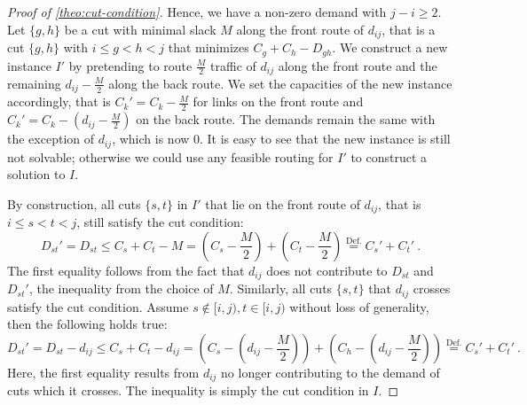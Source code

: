 \begin{proof}[Proof of \cref{theo:cut-condition}]
	Hence, we have a non-zero demand with $j - i \geq 2$. 
	Let $\{g, h\}$ be a cut with minimal slack $M$ along the front route of $d_{ij}$, that is a cut $\{g, h\}$ with $i \leq g < h < j$ that minimizes $C_g + C_h - D_{gh}$.
	We construct a new instance $I'$ by pretending to route $\frac{M}{2}$ traffic of $d_{ij}$ along the front route and the remaining $d_{ij} - \frac{M}{2}$ along the back route.
	We set the capacities of the new instance accordingly, that is $C_k' = C_k - \frac{M}{2}$ for links on the front route and $C_k' = C_k - (d_{ij} - \frac{M}{2})$ on the back route.
	The demands remain the same with the exception of $d_{ij}$, which is now $0$.
	It is easy to see that the new instance is still not solvable; otherwise we could use any feasible routing for $I'$ to construct a solution to $I$.
	
	By construction, all cuts $\{s, t\}$ in $I'$ that lie on the front route of $d_{ij}$, that is $i \leq s < t < j$, still satisfy the cut condition:
	\begin{equation}
		D_{st}' = D_{st} \leq C_{s} + C_{t} - M = (C_{s} - \frac{M}{2}) + (C_{t} - \frac{M}{2}) \stackrel{\mathrm{Def.}}{=} C_{s}' + C_{t}' \ .
	\end{equation}
	The first equality follows from the fact that $d_{ij}$ does not contribute to $D_{st}$ and $D_{st}'$, the inequality from the choice of $M$.
	Similarly, all cuts $\{s, t\}$ that $d_{ij}$ crosses satisfy the cut condition.
	Assume $s \notin [i, j), t \in [i, j)$ without loss of generality, then the following holds true:
	\begin{equation}
		D_{st}' = D_{st} - d_{ij} \leq C_s + C_t - d_{ij} = \left(C_s - \left(d_{ij} - \frac{M}{2}\right)\right) + \left(C_h - \left(d_{ij} - \frac{M}{2}\right)\right) \stackrel{\mathrm{Def.}}{=} C_s' + C_t' \ .
	\end{equation}
	Here, the first equality results from $d_{ij}$ no longer contributing to the demand of cuts which it crosses.
	The inequality is simply the cut condition in $I$.
	

\end{proof}

